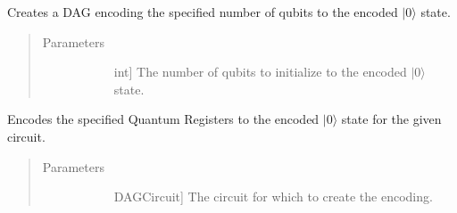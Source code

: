 \documentclass[letterpaper,10pt,english]{sphinxmanual}
\begin{document}
\begin{fulllineitems}
\begin{fulllineitems}
\begin{quote}
\begin{description}
\begin{description}
\end{description}

\end{description}\end{quote}

\end{fulllineitems}


\begin{fulllineitems}
\label{\detokenize{Base:BaseFaultTolerance.Encoder.createEncoderDag}}
Creates a DAG encoding the specified number of qubits to the encoded \(|0\rangle\) state.
\begin{quote}\begin{description}
\item[{Parameters}] \leavevmode\begin{description}
\item[{}] \leavevmode{[}int{]}
The number of qubits to initialize to the encoded \(|0\rangle\) state.

\end{description}

\end{description}\end{quote}

\end{fulllineitems}


\begin{fulllineitems}
\label{\detokenize{Base:BaseFaultTolerance.Encoder.getEncoderCircuit}}
Encodes the specified Quantum Registers to the encoded \(|0\rangle\) state for the given circuit.
\begin{quote}\begin{description}
\item[{Parameters}] \leavevmode\begin{description}
\item[{}] \leavevmode{[}DAGCircuit{]}
The circuit for which to create the encoding.


\end{description}
\end{description}
\end{quote}
\end{fulllineitems}
\end{fulllineitems}
\end{document}
